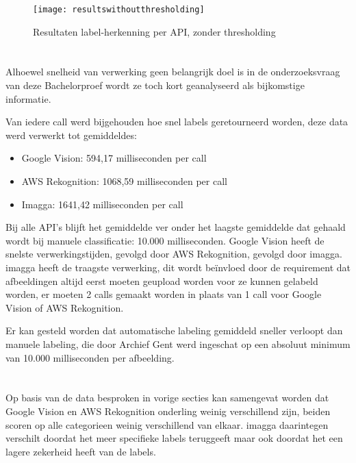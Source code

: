 \begin{figure}
    \centering    
    \texttt{[image: resultswithoutthresholding]}
    \caption{Resultaten label-herkenning per API, zonder thresholding}
    \label{fig:resultswithoutthresholding}
\end{figure}

\section{}
\label{sec:snelheid-per-api}
Alhoewel snelheid van verwerking geen belangrijk doel is in de onderzoeksvraag van deze Bachelorproef wordt ze toch kort geanalyseerd als bijkomstige informatie.

Van iedere call werd bijgehouden hoe snel labels geretourneerd worden, deze data werd verwerkt tot gemiddeldes:
\begin{itemize}
    \item Google Vision: 594,17 milliseconden per call
    \item AWS Rekognition: 1068,59 milliseconden per call
    \item Imagga: 1641,42 milliseconden per call
\end{itemize}

Bij alle API's blijft het gemiddelde ver onder het laagste gemiddelde dat gehaald wordt bij manuele classificatie: 10.000 milliseconden. Google Vision heeft de snelste verwerkingstijden, gevolgd door AWS Rekognition, gevolgd door imagga. imagga heeft de traagste verwerking, dit wordt beïnvloed door de requirement dat afbeeldingen altijd eerst moeten geupload worden voor ze kunnen gelabeld worden, er moeten 2 calls gemaakt worden in plaats van 1 call voor Google Vision of AWS Rekognition.

Er kan gesteld worden dat automatische labeling gemiddeld sneller verloopt dan manuele labeling, die door Archief Gent werd ingeschat op een absoluut minimum van 10.000 milliseconden per afbeelding.

\section{}
\label{sec:besluit}
Op basis van de data besproken in vorige secties kan samengevat worden dat Google Vision en AWS Rekognition onderling weinig verschillend zijn, beiden scoren op alle categorieen weinig verschillend van elkaar. imagga daarintegen verschilt doordat het meer specifieke labels teruggeeft maar ook doordat het een lagere zekerheid heeft van de labels.

